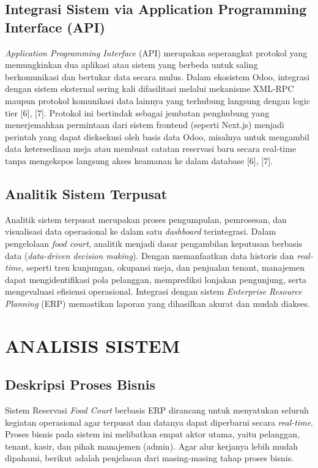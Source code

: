 \documentclass[conference]{IEEEtran}
\begin{document}
\subsection{Integrasi Sistem via Application Programming Interface (API)}
\textit{Application Programming Interface} (API) merupakan seperangkat protokol yang memungkinkan dua aplikasi atau sistem yang berbeda untuk saling berkomunikasi dan bertukar data secara mulus. Dalam ekosistem Odoo, integrasi dengan sistem eksternal sering kali difasilitasi melalui mekanisme XML-RPC maupun protokol komunikasi data lainnya yang terhubung langsung dengan logic tier [6], [7]. Protokol ini bertindak sebagai jembatan penghubung yang menerjemahkan permintaan dari sistem frontend (seperti Next.js) menjadi perintah yang dapat dieksekusi oleh basis data Odoo, misalnya untuk mengambil data ketersediaan meja atau membuat catatan reservasi baru secara real-time tanpa mengekspos langsung akses keamanan ke dalam database [6], [7].

\subsection{Analitik Sistem Terpusat}
Analitik sistem terpusat merupakan proses pengumpulan, pemrosesan, dan visualisasi data operasional ke dalam satu \textit{dashboard} terintegrasi. Dalam pengelolaan \textit{food court}, analitik menjadi dasar pengambilan keputusan berbasis data (\textit{data-driven decision making}). Dengan memanfaatkan data historis dan \textit{real-time}, seperti tren kunjungan, okupansi meja, dan penjualan tenant, manajemen dapat mengidentifikasi pola pelanggan, memprediksi lonjakan pengunjung, serta mengevaluasi efisiensi operasional. Integrasi dengan sistem \textit{Enterprise Resource Planning} (ERP) memastikan laporan yang dihasilkan akurat dan mudah diakses.


\section{ANALISIS SISTEM}

\subsection{Deskripsi Proses Bisnis}
Sistem Reservasi \textit{Food Court} berbasis ERP dirancang untuk menyatukan seluruh kegiatan operasional agar terpusat dan datanya dapat diperbarui secara \textit{real-time}. Proses bisnis pada sistem ini melibatkan empat aktor utama, yaitu pelanggan, tenant, kasir, dan pihak manajemen (admin). Agar alur kerjanya lebih mudah dipahami, berikut adalah penjelasan dari masing-masing tahap proses bisnis.
\end{document}
